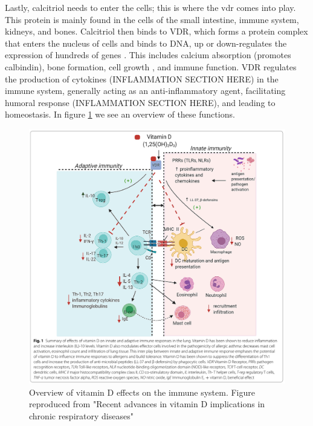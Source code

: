 Lastly, calcitriol needs to enter the cells; this is where the \gls{vdr} comes into play. This protein is mainly found in the cells of the small intestine, immune system, kidneys, and bones. Calcitriol then binds to VDR, which forms a protein complex that enters the nucleus of cells and binds to DNA, up or down-regulates the expression of hundreds of genes \cite{Nagpal2005, Dusso2005}. This includes calcium absorption (promotes calbindin), bone formation, cell growth \cite{Samuel2008}, and immune function. VDR regulates the production of cytokines (INFLAMMATION SECTION HERE) in the immune system, generally acting as an anti-inflammatory agent, facilitating humoral response (INFLAMMATION SECTION HERE), and leading to homeostasis. In figure \ref{fig:vitVDRimmune} we see an overview of these functions.

\begin{figure}[h!]
{
    \centering
    \includegraphics[width=1\textwidth]{figures/Vitamin D/VDRImmunity.png}
    \caption{Overview of vitamin D effects on the immune system. Figure reproduced from "Recent advances in vitamin D implications in chronic respiratory diseases" \cite{Gaudet2022}} 
    \label{fig:vitVDRimmune}
}
\medskip
\end{figure}

